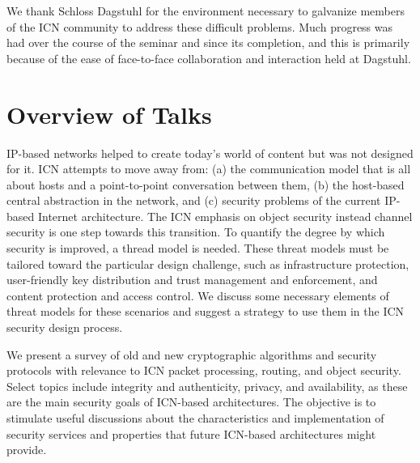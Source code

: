 \documentclass[a4paper,UKenglish]{dagrep}
\begin{document}
We thank Schloss Dagstuhl for the environment necessary to galvanize members of the ICN community to address these difficult problems. Much progress was had over the course of the seminar and since its completion, and this is primarily because of the ease of face-to-face collaboration and interaction held at Dagstuhl.

\tableofcontents


\section{Overview of Talks}

\license

IP-based networks helped to create today's world of content but was not designed for it. ICN attempts to move away from: (a) the communication model that is all about hosts and a point-to-point conversation between them, (b) the host-based central abstraction in the network, and (c) security problems of the current IP-based Internet architecture. The ICN emphasis on object security instead channel security is one step towards this transition. To quantify the degree by which security is improved, a thread model is needed. These threat models must be tailored toward the particular design challenge, such as infrastructure protection, user-friendly key distribution and trust management and enforcement, and content protection and access control. We discuss some necessary elements of threat models for these scenarios and suggest a strategy to use them in the ICN security design process.

\license

We present a survey of old and new cryptographic algorithms and security protocols with relevance to ICN packet processing, routing, and object security. Select topics include integrity and authenticity, privacy, and availability, as these are the main security goals of ICN-based architectures. The objective is to stimulate useful discussions about the characteristics and implementation of security services and properties that future ICN-based architectures might provide.
\end{document}

